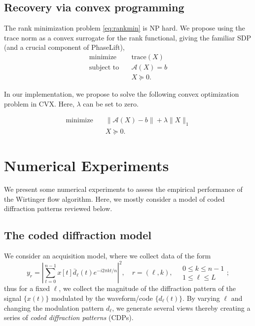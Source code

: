 \documentclass[conference,onecolumn,12pt]{IEEEtran}
\newcommand{\cA}{\mathcal{A}}
\newcommand{\<}{\langle}
\renewcommand{\>}{\rangle}
\numberwithin{equation}{section}
\begin{document}
\subsection{Recovery via convex programming}
The rank minimization problem \eqref{eq:rankmin} is NP hard. 
We propose using the trace norm as a convex surrogate
for the rank functional, giving the familiar
SDP (and a crucial component of PhaseLift),
\begin{equation}
\label{eq:tracemin}
 \begin{array}{ll}
    \text{minimize}   & \quad \text{trace}(X)\\ 
    \text{subject to} & \quad  \cA(X) = b\\
& \quad X \succeq 0. 
\end{array}
\end{equation}

In our implementation, we propose to solve the following convex optimization problem in CVX. Here, $\lambda$ can be set to zero.

\begin{equation}
  \label{eq:tracemin}
   \begin{array}{ll}
      \text{minimize}   & \quad \| \cA(X) - b\|+\lambda \|X\|_1\\ 
  & \quad X \succeq 0. 
  \end{array}
  \end{equation}


\section{Numerical Experiments}
\label{numsec}

We present some numerical experiments to assess the empirical
performance of the Wirtinger flow algorithm. Here, we mostly consider a model of
coded diffraction patterns reviewed below.


\subsection{The coded diffraction model}
\label{defCDP}

We consider an acquisition model, where we collect data of the form  
\begin{equation}
\label{mainCDPmodel}
  y_r = \left| \sum_{t = 0}^{n-1} x[t] \bar{d}_\ell(t) e^{-i2\pi k t/n}
  \right|^2, \quad r = (\ell, k), \quad \begin{array}{l} 0 \le k \le n-1\\
    1 \le \ell \le L
  \end{array};
  \end{equation}
  thus for a fixed $\ell$, we collect the magnitude of the diffraction
  pattern of the signal $\{x(t)\}$ modulated by the waveform/code
  $\{d_\ell(t)\}$. By varying $\ell$ and changing the modulation
  pattern $d_\ell$, we generate several views thereby creating a
  series of \emph{coded diffraction patterns} (CDPs).
\end{document}
